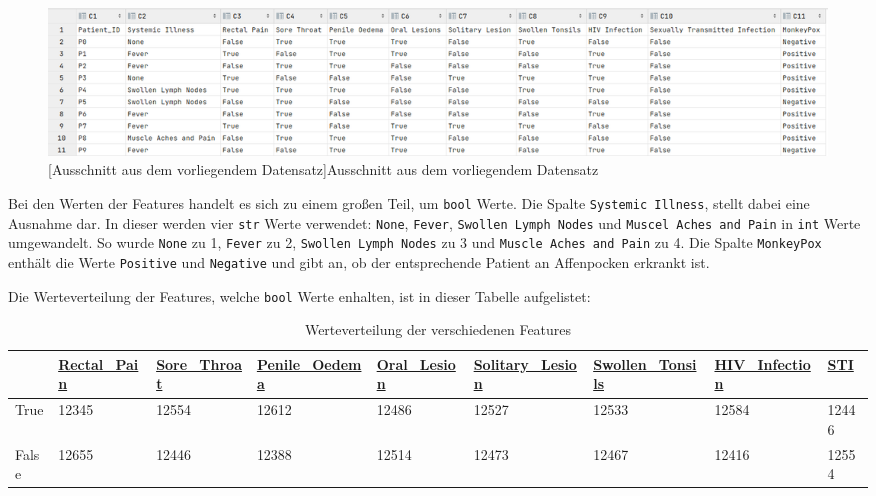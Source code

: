 \documentclass[13pt,a4paper, listof=entryprefix, bibliography=totocnumbered,toc=listofnumbered,lof=listofnumbered]{scrartcl}
\begin{document}
	\begin{figure}[H]
		\centering
		\includegraphics[width=0.8\linewidth]{Bilder/data_table.png}
		[Ausschnitt aus dem vorliegendem Datensatz]{Ausschnitt aus dem vorliegendem Datensatz}
		\label{fig:data_table}
	\end{figure}

	Bei den Werten der Features handelt es sich zu einem großen Teil, um \lstinline{bool} Werte. Die Spalte \lstinline{Systemic Illness}, stellt dabei eine Ausnahme dar. In dieser werden
	vier \lstinline{str} Werte verwendet: \lstinline{None}, \lstinline{Fever}, \lstinline{Swollen Lymph Nodes} und \lstinline{Muscel Aches and Pain} in \lstinline{int} Werte umgewandelt. So wurde \lstinline{None} zu 1,
	\lstinline{Fever} zu 2, \lstinline{Swollen Lymph Nodes} zu 3 und \lstinline{Muscle Aches and Pain} zu 4. Die Spalte \lstinline{MonkeyPox} enthält die Werte \lstinline{Positive} und \lstinline{Negative} und gibt
	an, ob der entsprechende Patient an Affenpocken erkrankt ist.

	Die Werteverteilung der Features, welche \lstinline{bool} Werte enhalten, ist in dieser Tabelle aufgelistet: 
	
	\begin{singlespace}
	\begin{table}[H]
		\begin{adjustbox}{width=1\textwidth}
			\small
		\begin{tabular}{|l|l|l|l|l|l|l|l|l|}
			\hline  & \url{Rectal_Pain}&  \url{Sore_Throat}	& \url{Penile_Oedema} & \url{Oral_Lesion} & \url{Solitary_Lesion} &\url{Swollen_Tonsils} & \url{HIV_Infection} & \url{STI} \\
			\hline True & 12345 & 12554 & 12612 & 12486 & 12527 & 12533 & 12584  & 12446 \\
			\hline False & 12655 & 12446 & 12388& 12514 & 12473 & 12467 & 12416 & 12554\\
			\hline
		\end{tabular}
	\end{adjustbox}
		\caption{Werteverteilung der verschiedenen Features} %
		\label{tab:werteverteilung_features}
	\end{table}
\end{singlespace}
	
\end{document}
